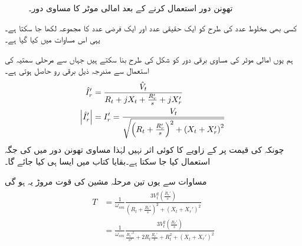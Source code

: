 %
\begin{figure}
\centering
%
\caption{تھوِنن دور استعمال کرنے کے بعد امالی موٹر کا مساوی دور۔}
\label{شکل_امالی_تھونن_استعمال_کرتے_ہوئے}
\end{figure}
کسی بھی مخلوط عدد کی طرح   کو ایک حقیقی عدد  اور ایک فرضی عدد  کا مجموعہ لکھا جا سکتا ہے۔ یہی اس مساوات میں کیا گیا ہے۔

ہم یوں امالی موٹر کی مساوی برقی دور کو شکل   کی طرح بنا سکتے ہیں جہاں سے مرحلی سمتیہ کی استعمال سے مندرجہ ذیل برقی رو  حاصل ہوتی ہے۔
\begin{gather}
\begin{aligned}\label{مساوات_امالی_گھمتا_رو}
\hat{I}_r'&=\frac{\hat{V}_t}{R_t +  j X_t +\frac{R_r'}{s}+ j X_r'}\\
\abs{\hat{I}_r'}&=I_r'=\frac{V_t}{\sqrt{\left(R_t+\frac{R_r'}{s} \right)^2+\left(X_t+X_r' \right)^2}}
\end{aligned}
\end{gather}
چونکہ  کی قیمت پر  کے زاویے کا کوئی اثر نہیں لہٰذا مساوی تھونن دور میں  کی جگہ   استعمال کیا جا سکتا ہے۔بقایا کتاب میں ایسا ہی کیا جائے گا۔ 

مساوات   سے یوں تین مرحلہ مشین کی قوت مروڑ یہ ہو گی
\begin{gather}
\begin{aligned}\label{مساوات_امالی_تین_دور_مروڑ_الف}
T&=\frac{1}{\omega_{sm}} \frac{3 V_t^2 \left(\frac{R_r'}{s} \right)}{\left(R_t+\frac{R_r'}{s} \right)^2+\left(X_t+X_r' \right)^2}\\
&=\frac{1}{\omega_{sm}} \frac{3 V_t^2 \left(\frac{R_r'}{s} \right)}{\frac{R_r'^2}{s^2}+2 R_t \frac{R_r'}{s}+R_t^2+\left(X_t+X_r' \right)^2}
\end{aligned}
\end{gather}


